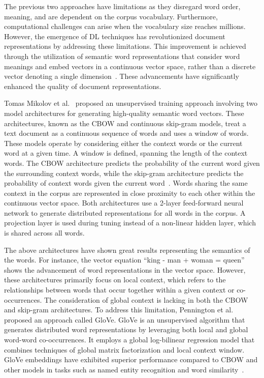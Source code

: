 The previous two approaches have limitations as they disregard word order, meaning, and are dependent on the corpus vocabulary. Furthermore, computational challenges can arise when the vocabulary size reaches millions. However, the emergence of \ac{DL} techniques has revolutionized document representations by addressing these limitations. This improvement is achieved through the utilization of semantic word representations that consider word meanings and embed vectors in a continuous vector space, rather than a discrete vector denoting a single dimension~\cite{mikolov2013efficient, pennington2014glove}. These advancements have significantly enhanced the quality of document representations.

Tomas Mikolov et al.~\cite{mikolov2013efficient} proposed an unsupervised training approach involving two model architectures for generating high-quality semantic word vectors. These architectures, known as the \ac{CBOW} and continuous skip-gram models, treat a text document as a continuous sequence of words and uses a window of words. These models operate by considering either the context words or the current word at a given time. A window is defined, spanning the length of the context words. The \ac{CBOW} architecture predicts the probability of the current word given the surrounding context words, while the skip-gram architecture predicts the probability of context words given the current word~\cite{mikolov2013efficient}. Words sharing the same context in the corpus are represented in close proximity to each other within the continuous vector space. Both architectures use a 2-layer feed-forward neural network to generate distributed representations for all words in the corpus. A projection layer is used during tuning instead of a non-linear hidden layer, which is shared across all words.


The above architectures have shown great results representing the semantics of the words. For instance, the vector equation ``king - man + woman = queen'' shows the advancement of word representations in the vector space. However, these architectures primarily focus on local context, which refers to the relationships between words that occur together within a given context or co-occurrences. The consideration of global context is lacking in both the \ac{CBOW} and skip-gram architectures. To address this limitation, Pennington et al.~\cite{pennington2014glove} proposed an approach called \ac{GloVe}. \ac{GloVe} is an unsupervised algorithm that generates distributed word representations by leveraging both local and global word-word co-occurrences. It employs a global log-bilinear regression model that combines techniques of global matrix factorization and local context window. \ac{GloVe} embeddings have exhibited superior performance compared to \ac{CBOW} and other models in tasks such as named entity recognition and word similarity~\cite{pennington2014glove}.

